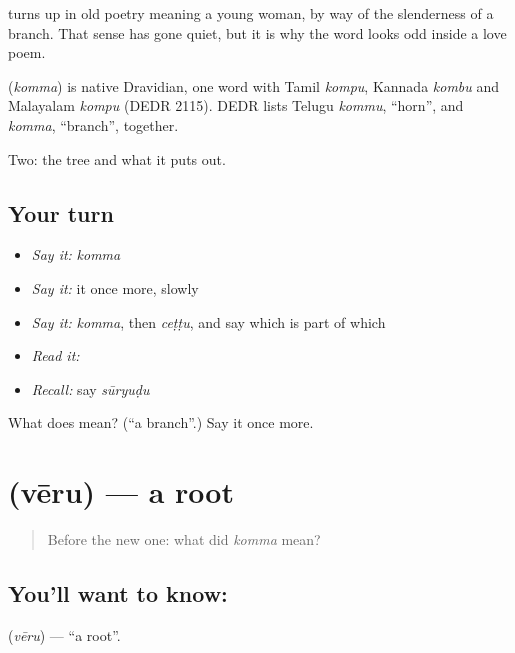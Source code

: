  turns up in old poetry meaning a young woman, by way of the slenderness of a branch. That sense has gone quiet, but it is why the word looks odd inside a love poem.

\begin{cousinweb}
\textbf{} (\emph{komma}) is native Dravidian, one word with Tamil \emph{kompu}, Kannada \emph{kombu} and Malayalam \emph{kompu} (DEDR 2115). DEDR lists Telugu \emph{kommu}, \textquotedblleft{}horn\textquotedblright{}, and \emph{komma}, \textquotedblleft{}branch\textquotedblright{}, together.
\end{cousinweb}

\begin{grammarlens}[title={What you've built}]
Two: the tree and what it puts out.
\end{grammarlens}

\subsection*{Your turn}
\begin{itemize}
\raggedright
  \item \emph{Say it:} \emph{komma}
  \item \emph{Say it:} it once more, slowly
  \item \emph{Say it:} \emph{komma}, then \emph{ceṭṭu}, and say which is part of which
  \item \emph{Read it:} \textbf{}
  \item \emph{Recall:} say \emph{sūryuḍu}
\end{itemize}

\begin{tcolorbox}[breakable,colback=teal!4,colframe=teal!35!black,title={Before you move on}]
What does  mean? (\textquotedblleft{}a branch\textquotedblright{}.) Say it once more.
\end{tcolorbox}
\section[\texorpdfstring{\te{వేరు} (vēru)}{వేరు (vēru)}]{ (vēru) — a root}

\label{lesson:TE-C54-root}



\begin{quote}
Before the new one: what did \emph{komma} mean?
\end{quote}

\subsection*{You'll want to know: }
\textbf{} (\emph{vēru}) — \textquotedblleft{}a root\textquotedblright{}.

